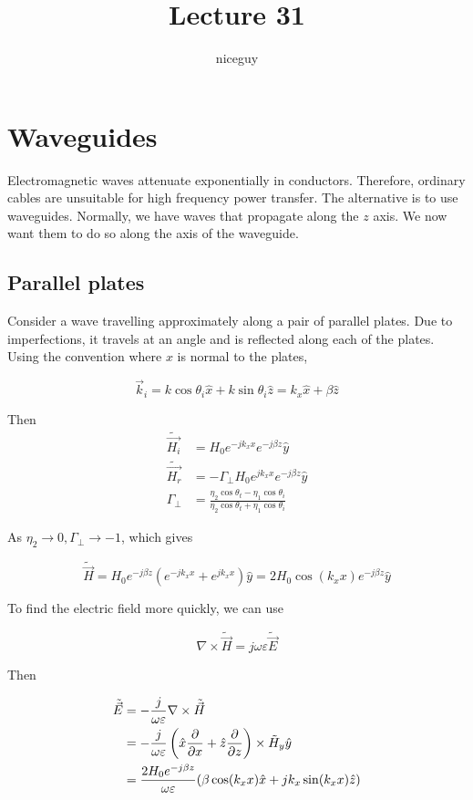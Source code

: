 \documentclass[12pt]{article}
\title{Lecture 31}
\author{niceguy}
\begin{document}
\maketitle

\section{Waveguides}

Electromagnetic waves attenuate exponentially in conductors. Therefore, ordinary cables are unsuitable for high frequency power transfer. The alternative is to use waveguides. Normally, we have waves that propagate along the $z$ axis. We now want them to do so along the axis of the waveguide.

\subsection{Parallel plates}

Consider a wave travelling approximately along a pair of parallel plates. Due to imperfections, it travels at an angle and is reflected along each of the plates. Using the convention where $x$ is normal to the plates,

$$\vec k_i = k\cos\theta_i\hat x + k\sin\theta_i\hat z = k_x\hat x + \beta\hat z$$

Then
\begin{align*}
    \tilde{\vec{H_i}} &= H_0e^{-jk_xx}e^{-j\beta z}\hat y \\
    \tilde{\vec{H_r}} &= -\Gamma_\perp H_0e^{jk_xx}e^{-j\beta z}\hat y \\
    \Gamma_\perp &= \frac{\eta_2\cos\theta_t - \eta_1\cos\theta_i}{\eta_2\cos\theta_t + \eta_1\cos\theta_i}
\end{align*}

As $\eta_2 \rightarrow 0, \Gamma_\perp \rightarrow -1$, which gives

$$\tilde{\vec H} = H_0e^{-j\beta z}\left(e^{-jk_xx} + e^{jk_xx}\right)\hat y = 2H_0\cos(k_xx)e^{-j\beta z}\hat y$$

To find the electric field more quickly, we can use

$$\nabla \times \tilde{\vec H} = j\omega\varepsilon \tilde{\vec E}$$

Then

\begin{align*}
    \tilde{\vec E} &= -\frac{j}{\omega\varepsilon} \nabla \times \tilde{\vec H} \\
                   &= -\frac{j}{\omega\varepsilon} \left(\hat x\frac{\partial }{\partial x} + \hat z\frac{\partial }{\partial z}\right) \times \tilde H_y \hat y \\
                   &= \frac{2H_0e^{-j\beta z}}{\omega\varepsilon}(\beta\cos(k_xx)\hat x + jk_x\sin(k_xx)\hat z)
\end{align*}
\end{document}
